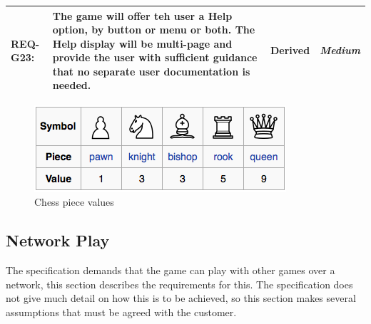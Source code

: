 \documentclass[a4paper,10pt]{article}
\begin{document}
\begin{table}[H]
\begin{tabular}{|| l | p{10.5cm}  |  c  | c ||}
\textbf{REQ-G23:} &
The game will offer teh user a Help option, by button or menu or both. The Help display will be multi-page and provide the user with sufficient guidance that no separate user documentation is needed. 
& Derived  &  \textit{Medium}\\



\hline
\end{tabular}
\end{table}

\begin{figure}
  \centering
	\includegraphics{Chess_piece_relative_value.png}
  \caption{Chess piece values  \label{fig:chessPieces}}
\end{figure}

\subsection{Network Play}

The specification demands that the game can play with other games over a network, this section describes the requirements for this. The specification does not give much detail on how this is to be achieved, so this section makes several assumptions that must be agreed with the customer.
\end{document}
